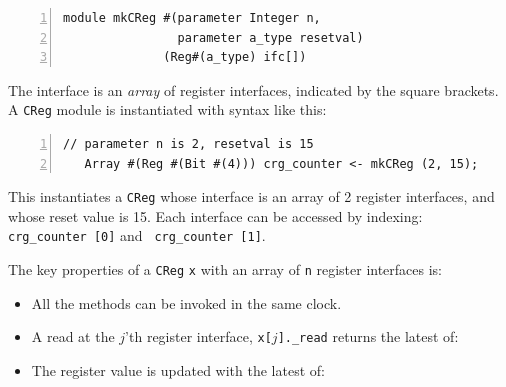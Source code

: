 {\footnotesize
\begin{Verbatim}[frame=single, numbers=left]
module mkCReg #(parameter Integer n,
                parameter a_type resetval)
              (Reg#(a_type) ifc[])
\end{Verbatim}
}

The interface is an \emph{array} of register interfaces, indicated by
the square brackets.  A \verb|CReg| module is instantiated with syntax
like this:

{\footnotesize
\begin{Verbatim}[frame=single, numbers=left]
   // parameter n is 2, resetval is 15
   Array #(Reg #(Bit #(4))) crg_counter <- mkCReg (2, 15);
\end{Verbatim}
}

This instantiates a \verb|CReg| whose interface is an array of 2
register interfaces, and whose reset value is 15.  Each interface can
be accessed by indexing: {\tt crg\_counter~[0]} and {\tt
crg\_counter~[1]}.

The key properties of a \verb|CReg| \verb|x| with an array of \verb|n|
register interfaces is:

\begin{itemize}
 \item All the methods can be invoked in the same clock.

 \item A read at the $j$'th register interface,{\ie} {\tt x[$j$].\_read}
       returns the latest of:


 \item The register value is updated with the latest of:

\end{itemize}

